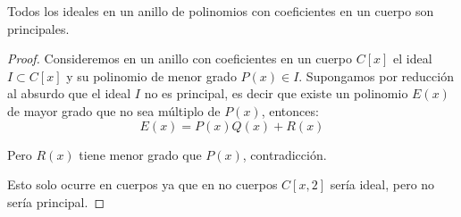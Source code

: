 \begin{thm}
    Todos los ideales en un anillo de polinomios con coeficientes en un cuerpo son principales.
    \label{thm:polinomio-cuerpo-ideales-principales}
\end{thm}

\begin{proof}
    Consideremos en un anillo con coeficientes en un cuerpo $C[x]$ el ideal $I \subset C[x]$ y su polinomio de menor grado $P(x) \in I$. Supongamos por reducción al absurdo que el ideal $I$ no es principal, es decir que existe un polinomio $E(x)$ de mayor grado que no sea múltiplo de $P(x)$, entonces:
    \begin{equation}
        E(x) = P(x)Q(x) + R(x)
    \end{equation}

    Pero $R(x)$ tiene menor grado que $P(x)$, contradicción.

    Esto solo ocurre en cuerpos ya que en no cuerpos $C[x, 2]$ sería ideal, pero no sería principal.
\end{proof}
